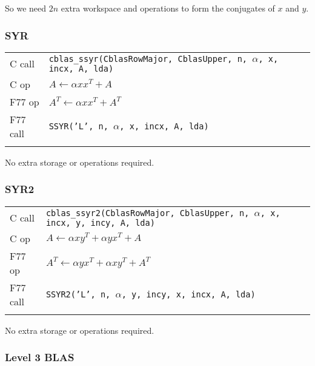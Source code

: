 \documentclass{article}
\begin{document}
So we need $2n$ extra workspace and operations to form the conjugates of $x$
and $y$.

\subsubsection{SYR}
{\small
\begin{tabular}{ll}
C call   & {\tt cblas\_ssyr(CblasRowMajor, CblasUpper, n, $\alpha$, x, incx, A, lda)}\\
C op     & $A \leftarrow \alpha x x^T + A$ \\
F77 op   & $A^T \leftarrow \alpha x x^T + A^T$ \\
F77 call & {\tt SSYR('L', n, $\alpha$, x, incx, A, lda)}\\\\
\end{tabular}
}

No extra storage or operations required.

\subsubsection{SYR2}
{\small
\begin{tabular}{ll}
C call   & {\tt cblas\_ssyr2(CblasRowMajor, CblasUpper, n, $\alpha$, x, incx, y, incy, A, lda)}\\
C op     & $A \leftarrow \alpha x y^T + \alpha y x^T + A$ \\
F77 op   & $A^T \leftarrow \alpha y x^T + \alpha x y^T + A^T$ \\
F77 call & {\tt SSYR2('L', n, $\alpha$, y, incy, x, incx, A, lda)}\\\\
\end{tabular}
}

No extra storage or operations required.

\subsubsection{Level 3 BLAS}
\end{document}
